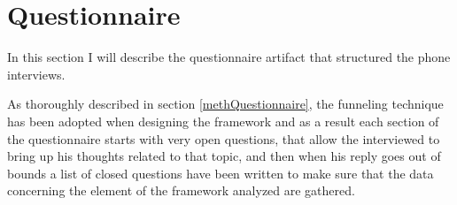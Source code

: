 \section{Questionnaire}

In this section I will describe the questionnaire artifact that structured the phone interviews.

As thoroughly described in section \ref{methQuestionnaire}, the funneling technique has been adopted when designing the framework and as a result each section of the questionnaire starts with very open questions, that allow the interviewed to bring up his thoughts related to that topic, and then when his reply goes out of bounds a list of closed questions have been written to make sure that the data concerning the element of the framework analyzed are gathered.







